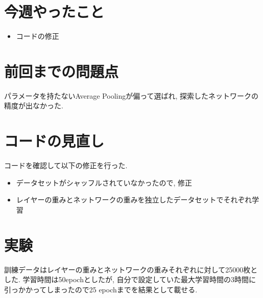 \documentclass[twocolumn]{jarticle}     %
\begin{document}


\section{今週やったこと}
\begin{itemize}
	\item {コードの修正}
\end{itemize}

\section{前回までの問題点}
パラメータを持たないAverage Poolingが偏って選ばれ, 探索したネットワークの精度が出なかった.

\section{コードの見直し}
コードを確認して以下の修正を行った.

\begin{itemize}
  \item データセットがシャッフルされていなかったので, 修正
  \item レイヤーの重みとネットワークの重みを独立したデータセットでそれぞれ学習
\end{itemize}

\section{実験}
訓練データはレイヤーの重みとネットワークの重みそれぞれに対して25000枚とした.
学習時間は50epochとしたが, 自分で設定していた最大学習時間の3時間に引っかかってしまったので25 epochまでを結果として載せる.
\end{document}
